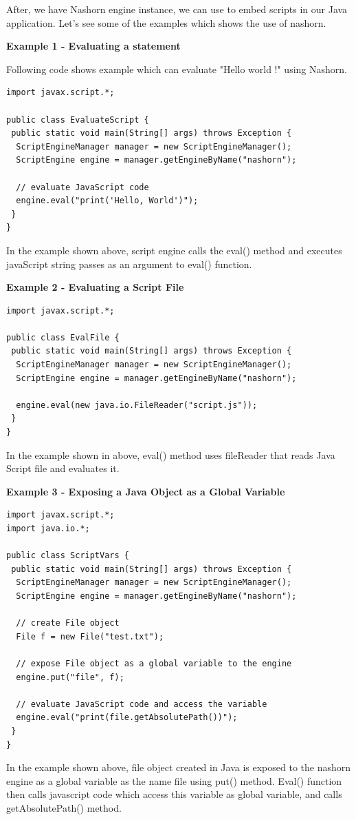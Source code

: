 After, we have Nashorn engine instance, we can use to embed scripts in our Java application. Let's see some of the examples which shows the use of nashorn.

\textbf{Example 1 - Evaluating a statement}


Following code shows example which can evaluate "Hello world !" using Nashorn.


\begin{lstlisting}[frame=single]
import javax.script.*;

public class EvaluateScript {
 public static void main(String[] args) throws Exception {
  ScriptEngineManager manager = new ScriptEngineManager();
  ScriptEngine engine = manager.getEngineByName("nashorn");
  
  // evaluate JavaScript code
  engine.eval("print('Hello, World')");
 }
}
\end{lstlisting}

In the example shown above, script engine calls the eval() method and executes javaScript string passes as an argument to eval() function. 


\textbf{Example 2 - Evaluating a Script File}

\begin{lstlisting}[frame=single]
import javax.script.*;

public class EvalFile {
 public static void main(String[] args) throws Exception {
  ScriptEngineManager manager = new ScriptEngineManager();
  ScriptEngine engine = manager.getEngineByName("nashorn");
  
  engine.eval(new java.io.FileReader("script.js"));
 }
}
\end{lstlisting}

In the example shown in above, eval() method uses fileReader that reads Java Script file and evaluates it.


\textbf{Example 3 - Exposing a Java Object as a Global Variable}

\begin{lstlisting}[frame=single]
import javax.script.*;
import java.io.*;

public class ScriptVars {
 public static void main(String[] args) throws Exception {
  ScriptEngineManager manager = new ScriptEngineManager();
  ScriptEngine engine = manager.getEngineByName("nashorn");
  
  // create File object
  File f = new File("test.txt");
  
  // expose File object as a global variable to the engine
  engine.put("file", f);
  
  // evaluate JavaScript code and access the variable
  engine.eval("print(file.getAbsolutePath())");
 }
}

\end{lstlisting}

In the example shown above, file object created in Java is exposed to the nashorn engine as a global variable as the name file using put() method. Eval() function then calls javascript code which access this variable as global variable, and calls getAbsolutePath() method.